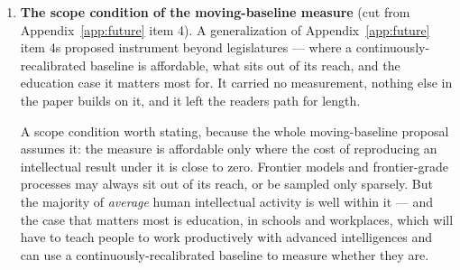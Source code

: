 \begin{enumerate}
  \begin{quote}
  And a weaker form of the larger point survives the dispute between
  readings entirely, because it does not depend on what the register refers
  to. The standing defence of the market as social oracle has never been
  that it measures well; it is that nothing measures better --- the best of
  bad options. What this result demonstrates is the arrival of another kind
  of option: a bespoke measure, elicited blind from aggregated human
  experience at trivial cost, preregistered, and better than the fitted
  schemas on the first outcome it was pointed at. Whether it found referent
  or veil, the capability generalises --- measures like this can now be built
  per question, blinded by construction, and checked --- and every one built
  weakens "best of bad options" as an argument for reading social structure
  off prices alone.
  \end{quote}
\item
  \textbf{The scope condition of the moving-baseline measure} (cut from Appendix~\ref{app:future}
  item 4). A generalization of Appendix~\ref{app:future} item 4\textquotesingle s proposed instrument beyond
  legislatures --- where a continuously-recalibrated baseline is affordable,
  what sits out of its reach, and the education case it matters most for. It
  carried no measurement, nothing else in the paper builds on it, and it left
  the reader\textquotesingle s path for length.

  A scope condition worth stating, because the whole moving-baseline
  proposal assumes it: the measure is affordable only where the cost of
  reproducing an intellectual result under it is close to zero. Frontier
  models and frontier-grade processes may always sit out of its reach, or be
  sampled only sparsely. But the majority of \emph{average} human intellectual
  activity is well within it --- and the case that matters most is education,
  in schools and workplaces, which will have to teach people to work
  productively with advanced intelligences and can use a
  continuously-recalibrated baseline to measure whether they are.
\end{enumerate}
